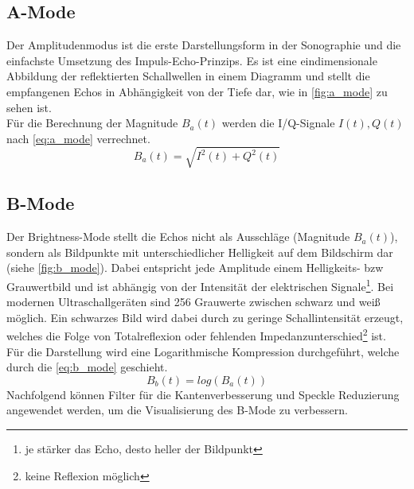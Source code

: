 \subsection{A-Mode}\label{a-mode}
Der \glqq Amplitudenmodus\grqq{} ist die erste Darstellungsform in der Sonographie und die einfachste Umsetzung des Impuls-Echo-Prinzips. Es ist eine eindimensionale Abbildung der reflektierten Schallwellen in einem Diagramm und stellt die empfangenen Echos in Abhängigkeit von der Tiefe dar, wie in \autoref{fig:a_mode} zu sehen ist.\\
Für die Berechnung der Magnitude $B_a(t)$ werden die I/Q-Signale $I(t),Q(t)$ nach \autoref{eq:a_mode} verrechnet.\cite[Kap. 4 S. 5ff]{brucher_ultra}
\begin{equation}
B_a(t)=\sqrt{I^2(t)+Q^2(t)}\label{eq:a_mode}
\end{equation}
\subsection{B-Mode}\label{b-mode} 
Der \glqq Brightness-Mode\grqq{} stellt die Echos nicht als Ausschläge (Magnitude $B_a(t)$), sondern als Bildpunkte mit unterschiedlicher Helligkeit auf dem Bildschirm dar (siehe \autoref{fig:b_mode}). Dabei entspricht jede Amplitude einem Helligkeits- \ac{bzw} Grauwertbild und ist abhängig von der Intensität der elektrischen Signale\footnote{je stärker das Echo, desto heller der Bildpunkt}. Bei modernen Ultraschallgeräten sind 256 Grauwerte zwischen schwarz und weiß möglich. Ein schwarzes Bild wird dabei durch zu geringe Schallintensität erzeugt, welches die Folge von Totalreflexion oder fehlenden Impedanzunterschied\footnote{keine Reflexion möglich} ist.\\
Für die Darstellung wird eine Logarithmische Kompression durchgeführt, welche durch die \autoref{eq:b_mode} geschieht.
\begin{equation}
B_b(t)=log\left(B_a(t)\right)\label{eq:b_mode}
\end{equation}
Nachfolgend können Filter für die Kantenverbesserung und Speckle Reduzierung angewendet werden, um die Visualisierung des B-Mode zu verbessern.\cite[Kap. 4 S. 5ff]{brucher_ultra}
